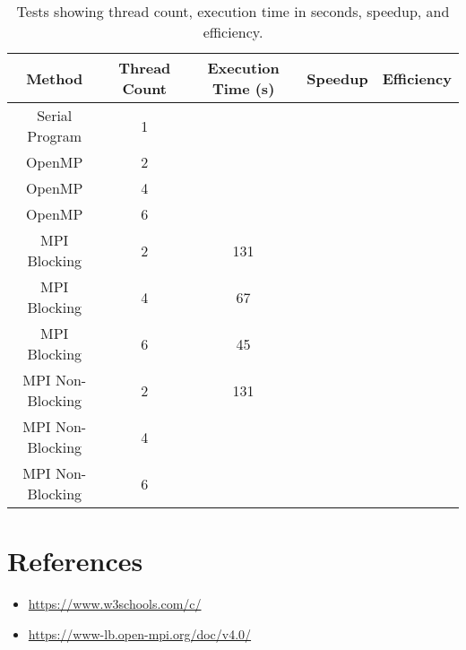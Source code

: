 \documentclass{article}
\begin{document}
	\begin{table}
		\centering
		\begin{tabular}{|c|c|c|c|c|}
			\hline
			\textbf{Method} & \textbf{Thread Count} & \textbf{Execution Time (s)} & \textbf{Speedup} & \textbf{Efficiency} \\
			\hline
			Serial Program   & 1 & &  &  \\
			OpenMP           & 2 & & & \\
			OpenMP           & 4 & & & \\
			OpenMP           & 6 & & & \\
			MPI Blocking     & 2 & 131 & & \\
			MPI Blocking     & 4 & 67 & & \\
			MPI Blocking     & 6 & 45 & & \\
			MPI Non-Blocking & 2 & 131 & & \\
			MPI Non-Blocking & 4 & & & \\
			MPI Non-Blocking & 6 & & & \\
			\hline
		\end{tabular}
		\caption{Tests showing thread count, execution time in seconds, speedup, and efficiency.}
		\label{table1}
	\end{table}
	
	\clearpage
	
	\section{References}
	\begin{itemize}
		\item \href{https://www.w3schools.com/c/}{https://www.w3schools.com/c/}
		\item \href{https://www-lb.open-mpi.org/doc/v4.0/}{https://www-lb.open-mpi.org/doc/v4.0/}
	\end{itemize}
	
\end{document}
